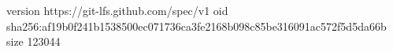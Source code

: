 version https://git-lfs.github.com/spec/v1
oid sha256:af19b0f241b1538500ec071736ca3fe2168b098c85be316091ac572f5d5da66b
size 123044

